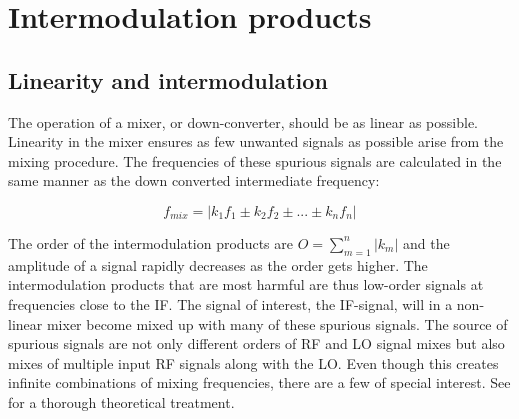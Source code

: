 	\section{Intermodulation products}
		\subsection{Linearity and intermodulation}
			The operation of a mixer, or down-converter, should be as linear as possible. Linearity in the mixer ensures as few unwanted signals as possible arise from the mixing procedure. The frequencies of these spurious signals are calculated in the same manner as the down converted intermediate frequency:\autocite{bahl03}

			\begin{equation}\label{eq:spurs}
				f_{mix} = |k_1f_1\pm k_2f_2 \pm ... \pm k_nf_n|
			\end{equation}

			The order of the intermodulation products are $O=\sum_{m=1}^n|k_m|$ and the amplitude of a signal rapidly decreases as the order gets higher. The intermodulation products that are most harmful are thus low-order signals at frequencies close to the IF. The signal of interest, the IF-signal, will in a non-linear mixer become mixed up with many of these spurious signals. The source of spurious signals are not only different orders of RF and LO signal mixes but also mixes of multiple input RF signals along with the LO. Even though this creates infinite combinations of mixing frequencies, there are a few of special interest. See \citeauthor{kundert02} for a thorough theoretical treatment\autocite{kundert02}.



